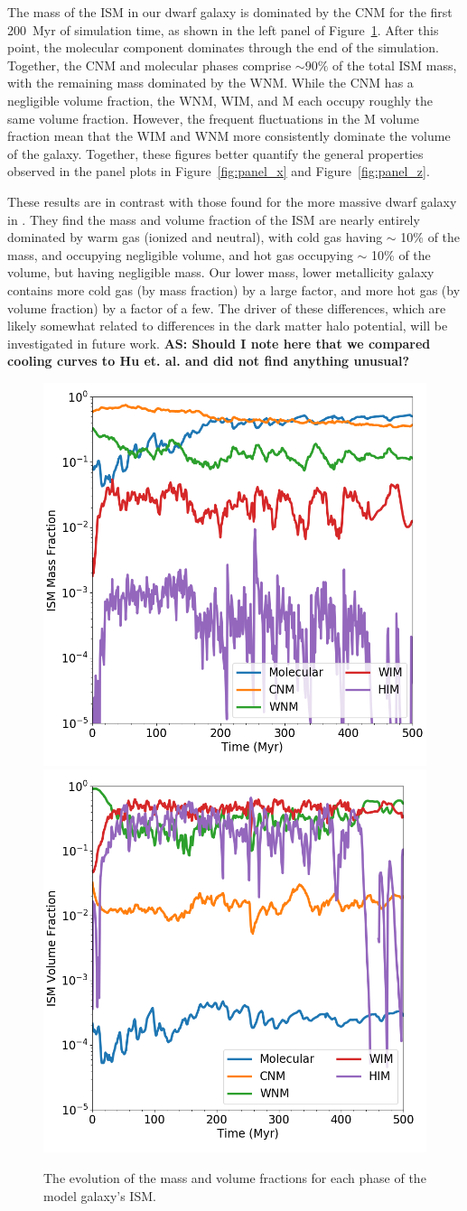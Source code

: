 \documentclass[twocolumn]{aastex61}
\begin{document}
The mass of the ISM in our dwarf galaxy is dominated by the CNM for the first 200~Myr of simulation time, as shown in the left panel of Figure~\ref{fig:ISM_evolution}. After this point, the molecular component dominates through the end of the simulation. Together, the CNM and molecular phases comprise $\sim 90\%$ of the total ISM mass, with the remaining mass dominated by the WNM. While the CNM has a negligible volume fraction, the WNM, WIM, and M each occupy roughly the same volume fraction. However, the frequent fluctuations in the M volume fraction mean that the WIM and WNM more consistently dominate the volume of the galaxy. Together, these figures better quantify the general properties observed in the panel plots in Figure~\ref{fig:panel_x} and Figure~\ref{fig:panel_z}. 

These results are in contrast with those found for the more massive dwarf galaxy in \citet{Hu2016,Hu2017}. They find the mass and volume fraction of the ISM are nearly entirely dominated by warm gas (ionized and neutral), with cold gas having $\sim$ 10\% of the mass, and occupying negligible volume, and hot gas occupying $\sim$ 10\% of the volume, but having negligible mass. Our lower mass, lower metallicity galaxy contains more cold gas (by mass fraction) by a large factor, and more hot gas (by volume fraction) by a factor of a few. The driver of these differences, which are likely somewhat related to differences in the dark matter halo potential, will be investigated in future work.
\textbf{AS: Should I note here that we compared cooling curves to Hu et. al. and did not find anything unusual?}

\begin{figure}
\centering
\includegraphics[width=0.45\linewidth]{phase_mass_fraction_evolution_log.png}
\includegraphics[width=0.45\linewidth]{phase_volume_fraction_evolution_log.png}
\caption{The evolution of the mass and volume fractions for each phase of the model galaxy's ISM.}
\label{fig:ISM_evolution}
\end{figure}
\end{document}
